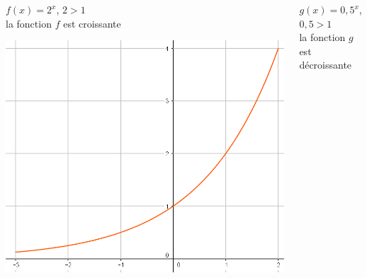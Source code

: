 \documentclass[xcolor={dvipsnames}]{beamer}
\begin{document}
\begin{frame}
\begin{myex}
	\begin{columns}{}
		\begin{column}{6cm}
					
			$f(x)= 2^x$, $2 > 1$\\
			la fonction $f$ est croissante
		
			\begin{center}
				\includegraphics[scale=0.25]{var1}
			\end{center}
		
		\end{column}
		
		\begin{column}{6cm}
			$g(x)= 0,5^x$, $0,5 > 1$\\
			la fonction $g$ est décroissante
			

\end{column}
\end{columns}
\end{myex}
\end{frame}
\end{document}
